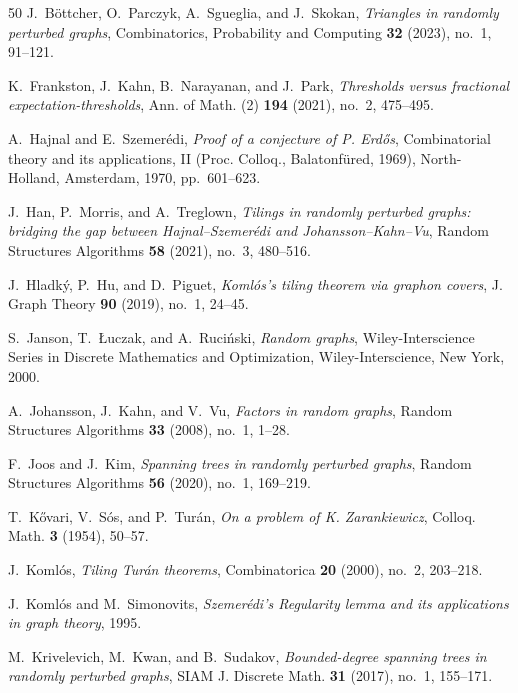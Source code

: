 \documentclass[reqno, 12pt]{amsart}
\numberwithin{equation}{section}
\numberwithin{figure}{section}
\theoremstyle{plain}
\theoremstyle{definition}
\begin{document}
\begin{thebibliography}{50}
J.~B{\"o}ttcher, O.~Parczyk, A.~Sgueglia, and J.~Skokan, \emph{Triangles in randomly perturbed graphs}, Combinatorics, Probability and Computing \textbf{32} (2023), no.~1, 91--121.

K.~Frankston, J.~Kahn, B.~Narayanan, and J.~Park, \emph{Thresholds versus fractional expectation-thresholds}, Ann. of Math. (2) \textbf{194} (2021), no.~2, 475--495. 

A.~Hajnal and E.~Szemer\'{e}di, \emph{Proof of a conjecture of {P}. {E}rd{\H{o}}s}, Combinatorial theory and its applications, {II} ({P}roc. {C}olloq., {B}alatonf\"{u}red, 1969), North-Holland, Amsterdam, 1970, pp.~601--623.

J.~Han, P.~Morris, and A.~Treglown, \emph{Tilings in randomly perturbed graphs: bridging the gap between {H}ajnal--{S}zemer\'{e}di and {J}ohansson--{K}ahn--{V}u}, Random Structures Algorithms \textbf{58} (2021), no.~3, 480--516. 

J.~Hladk\'{y}, P.~Hu, and D.~Piguet, \emph{Koml\'{o}s's tiling theorem via graphon covers}, J. Graph Theory \textbf{90} (2019), no.~1, 24--45. 

S.~Janson, T.~{\L}uczak, and A.~Ruci\'{n}ski, \emph{Random graphs}, Wiley-Interscience Series in Discrete Mathematics and Optimization, Wiley-Interscience, New York, 2000. 

A.~Johansson, J.~Kahn, and V.~Vu, \emph{Factors in random graphs}, Random Structures Algorithms \textbf{33} (2008), no.~1, 1--28.

F.~Joos and J.~Kim, \emph{Spanning trees in randomly perturbed graphs}, Random Structures Algorithms \textbf{56} (2020), no.~1, 169--219. 

T.~K\H{o}vari, V.~S\'{o}s, and P.~Tur\'{a}n, \emph{On a problem of {K}. {Z}arankiewicz}, Colloq. Math. \textbf{3} (1954), 50--57. 

J.~Koml\'{o}s, \emph{Tiling {T}ur\'{a}n theorems}, Combinatorica \textbf{20} (2000), no.~2, 203--218. 

J.~Koml{\'o}s and M.~Simonovits, \emph{Szemer\'edi's {R}egularity lemma and its applications in graph theory}, 1995.

M.~Krivelevich, M.~Kwan, and B.~Sudakov, \emph{Bounded-degree spanning trees in randomly perturbed graphs}, SIAM J. Discrete Math. \textbf{31} (2017), no.~1, 155--171. 


\end{thebibliography}
\end{document}
